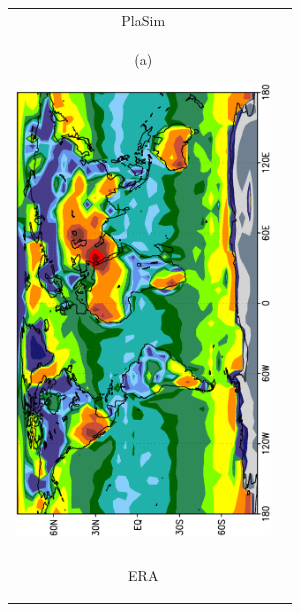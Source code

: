 \documentclass[12pt,a4paper,twoside,openright,headinclude,liststotoc,bibtotoc]{scrreprt}
\begin{document}
\begin{figure}[b]
\begin{tabular}{cc}
\hspace{-0.5cm}PlaSim
\\
\begin{minipage}{1.0\textwidth}
\begin{center}
\begin{scriptsize}(a)\end{scriptsize}\hspace{-1cm}\includegraphics[height=12.0cm,angle=-90]{eps/zonaltmbow.eps} 
\end{center}
\end{minipage}
\\
\\
\begin{minipage}{1.0\textwidth}\hspace{7.9cm}ERA\vspace{-0.6cm}
\begin{center}

\end{center}
\end{minipage}
\end{tabular}
\end{figure}
\end{document}
